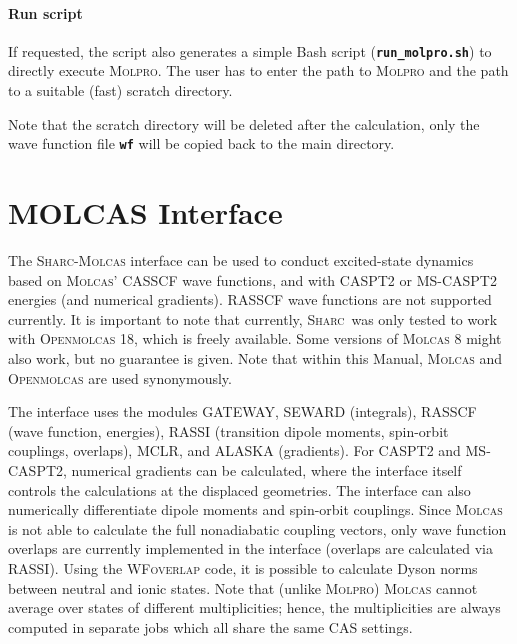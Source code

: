 \documentclass[a4paper,10pt,DIV=15,openany]{scrbook}
\newcommand{\sharc}{\textsc{Sharc}}
\newcommand{\ttt}[1]{\textbf{\texttt{#1}}}
\begin{document}
\paragraph{Run script}

If requested, the script also generates a simple Bash script (\ttt{run\_molpro.sh}) to directly execute \textsc{Molpro}. The user has to enter the path to \textsc{Molpro} and the path to a suitable (fast) scratch directory. 

Note that the scratch directory will be deleted after the calculation, only the wave function file \ttt{wf} will be copied back to the main directory.








\section{MOLCAS Interface}\label{sec:int:molcas}

The \sharc-\textsc{Molcas} interface can be used to conduct excited-state dynamics based on \textsc{Molcas}' CASSCF wave functions, and with CASPT2 or MS-CASPT2 energies (and numerical gradients). 
RASSCF wave functions are not supported currently. 
It is important to note that currently, \sharc\ was only tested to work with \textsc{Openmolcas} 18, which is freely available.
Some versions of \textsc{Molcas} 8 might also work, but no guarantee is given.
Note that within this Manual, \textsc{Molcas} and \textsc{Openmolcas} are used synonymously.

The interface uses the modules GATEWAY, SEWARD (integrals), RASSCF (wave function, energies), RASSI (transition dipole moments, spin-orbit couplings, overlaps), MCLR, and ALASKA (gradients). 
For CASPT2 and MS-CASPT2, numerical gradients can be calculated, where the interface itself controls the calculations at the displaced geometries. 
The interface can also numerically differentiate dipole moments and spin-orbit couplings.
Since \textsc{Molcas} is not able to calculate the full nonadiabatic coupling vectors, only wave function overlaps are currently implemented in the interface (overlaps are calculated via RASSI). 
Using the \textsc{WFoverlap} code, it is possible to calculate Dyson norms between neutral and ionic states.
Note that (unlike \textsc{Molpro}) \textsc{Molcas} cannot average over states of different multiplicities; hence, the multiplicities are always computed in separate jobs which all share the same CAS settings.
\end{document}
